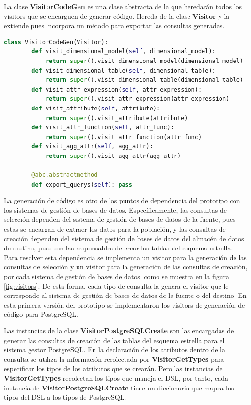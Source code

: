 La clase \textbf{VisitorCodeGen} es una clase abstracta de la que heredar\'an todos los visitors que 
se encarguen de generar código. Hereda de la clase \textbf{Visitor} y la extiende pues incorpora un 
método para exportar las consultas generadas.

\begin{lstlisting}[label={code:vcodegen}, caption={Clase VisitorCodeGen}, language={python}]
    class VisitorCodeGen(Visitor):
        def visit_dimensional_model(self, dimensional_model):
            return super().visit_dimensional_model(dimensional_model)
        def visit_dimensional_table(self, dimensional_table):
            return super().visit_dimensional_table(dimensional_table)
        def visit_attr_expression(self, attr_expression):
            return super().visit_attr_expression(attr_expression)
        def visit_attribute(self, attribute):
            return super().visit_attribute(attribute)
        def visit_attr_function(self, attr_func):
            return super().visit_attr_function(attr_func)
        def visit_agg_attr(self, agg_attr):
            return super().visit_agg_attr(agg_attr)

        @abc.abstractmethod
        def export_querys(self): pass
\end{lstlisting}

La generación de código es otro de los puntos de dependencia del prototipo con los sistemas de gestión 
de bases de datos. Específicamente, las consultas de selección dependen del sistema de gestión de bases 
de datos de la fuente, pues estas se encargan de extraer los datos para la población, y las consultas 
de creación dependen del sistema de gestión de bases de datos del almacén de datos de destino, pues 
son las responsables de crear las tablas del esquema estrella. Para resolver esta dependencia 
se implementa un visitor para la generación de las consultas de selección y un visitor para la generación 
de las consultas de creación, por cada sistema de gestión de bases de datos, como se muestra en la 
figura \ref{fig:visitors}. De esta forma, cada tipo de consulta la genera el visitor que le corresponde 
al sistema de gestión de bases de datos de la fuente o del destino. En esta primera versión del prototipo 
se implementaron los visitors de generación de código para PostgreSQL.

Las instancias de la clase \textbf{VisitorPostgreSQLCreate} son las encargadas de generar las 
consultas de creación de las tablas del esquema estrella para el sistema gestor PostgreSQL. En la 
declaración de los atributos 
dentro de la consulta se utiliza la información recolectada por \textbf{VisitorGetTypes} para 
especificar los tipos de los atributos que se crear\'an. Pero las instancias de \textbf{VisitorGetTypes} 
recolectan los tipos que maneja el DSL, por tanto, cada instancia de \textbf{VisitorPostgreSQLCreate} 
tiene un diccionario que mapea los tipos del DSL a los tipos de PostgreSQL.


